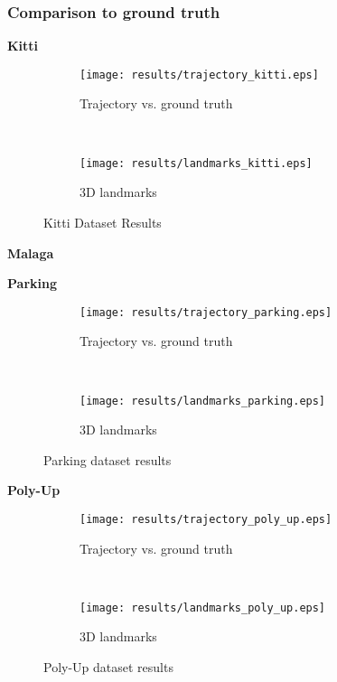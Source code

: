 \subsubsection{Comparison to ground truth}
\textbf{Kitti}
\begin{figure*}[ht!]
    \centering
    \begin{subfigure}[t]{0.5\textwidth}
        \centering
        \texttt{[image: results/trajectory\_kitti.eps]}
        \caption{Trajectory vs. ground truth}
    \end{subfigure}%
    ~ 
    \begin{subfigure}[t]{0.5\textwidth}
        \centering
        \texttt{[image: results/landmarks\_kitti.eps]}
        \caption{3D landmarks}
    \end{subfigure}
    \caption{Kitti Dataset Results}
		\label{parking_result_fig}
\end{figure*}

\textbf{Malaga}


\textbf{Parking}
\begin{figure*}[ht!]
    \centering
    \begin{subfigure}[t]{0.5\textwidth}
        \centering
        \texttt{[image: results/trajectory\_parking.eps]}
        \caption{Trajectory vs. ground truth}
    \end{subfigure}%
    ~ 
    \begin{subfigure}[t]{0.5\textwidth}
        \centering
        \texttt{[image: results/landmarks\_parking.eps]}
        \caption{3D landmarks}
    \end{subfigure}
    \caption{Parking dataset results}
		\label{parking_result_fig}
\end{figure*}

\textbf{Poly-Up}
\begin{figure*}[ht!]
    \centering
    \begin{subfigure}[t]{0.5\textwidth}
        \centering
        \texttt{[image: results/trajectory\_poly\_up.eps]}
        \caption{Trajectory vs. ground truth}
    \end{subfigure}%
    ~ 
    \begin{subfigure}[t]{0.5\textwidth}
        \centering
        \texttt{[image: results/landmarks\_poly\_up.eps]}
        \caption{3D landmarks}
    \end{subfigure}
    \caption{Poly-Up dataset results}
		\label{poly_up_result_fig}
\end{figure*}

